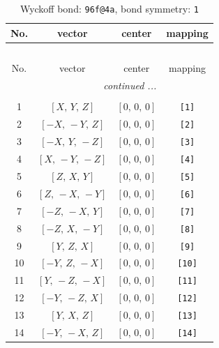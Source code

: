 \documentclass[fleqn,8pt]{jsarticle}
\begin{document}
\begin{longtable}{cccc}
\caption{Wyckoff bond: {\tt 96f@4a}, bond symmetry: {\tt 1}}
 \\
 \hline \hline
No. & vector & center & mapping \\ \hline \endfirsthead

\multicolumn{3}{l}{\tablename\ \thetable{}} \\
 \hline \hline
No. & vector & center & mapping \\ \hline \endhead

 \hline \hline
\multicolumn{3}{r}{\footnotesize\it continued ...} \\ \endfoot

 \hline \hline
\multicolumn{3}{r}{} \\ \endlastfoot

1 & $\left[ X,\, Y,\, Z \right]$ & $\left[ 0,\, 0,\, 0 \right]$ & {\tt [1]} \\ \hline
2 & $\left[ - X,\, - Y,\, Z \right]$ & $\left[ 0,\, 0,\, 0 \right]$ & {\tt [2]} \\ \hline
3 & $\left[ - X,\, Y,\, - Z \right]$ & $\left[ 0,\, 0,\, 0 \right]$ & {\tt [3]} \\ \hline
4 & $\left[ X,\, - Y,\, - Z \right]$ & $\left[ 0,\, 0,\, 0 \right]$ & {\tt [4]} \\ \hline
5 & $\left[ Z,\, X,\, Y \right]$ & $\left[ 0,\, 0,\, 0 \right]$ & {\tt [5]} \\ \hline
6 & $\left[ Z,\, - X,\, - Y \right]$ & $\left[ 0,\, 0,\, 0 \right]$ & {\tt [6]} \\ \hline
7 & $\left[ - Z,\, - X,\, Y \right]$ & $\left[ 0,\, 0,\, 0 \right]$ & {\tt [7]} \\ \hline
8 & $\left[ - Z,\, X,\, - Y \right]$ & $\left[ 0,\, 0,\, 0 \right]$ & {\tt [8]} \\ \hline
9 & $\left[ Y,\, Z,\, X \right]$ & $\left[ 0,\, 0,\, 0 \right]$ & {\tt [9]} \\ \hline
10 & $\left[ - Y,\, Z,\, - X \right]$ & $\left[ 0,\, 0,\, 0 \right]$ & {\tt [10]} \\ \hline
11 & $\left[ Y,\, - Z,\, - X \right]$ & $\left[ 0,\, 0,\, 0 \right]$ & {\tt [11]} \\ \hline
12 & $\left[ - Y,\, - Z,\, X \right]$ & $\left[ 0,\, 0,\, 0 \right]$ & {\tt [12]} \\ \hline
13 & $\left[ Y,\, X,\, Z \right]$ & $\left[ 0,\, 0,\, 0 \right]$ & {\tt [13]} \\ \hline
14 & $\left[ - Y,\, - X,\, Z \right]$ & $\left[ 0,\, 0,\, 0 \right]$ & {\tt [14]} \\ \hline

\end{longtable}
\end{document}

